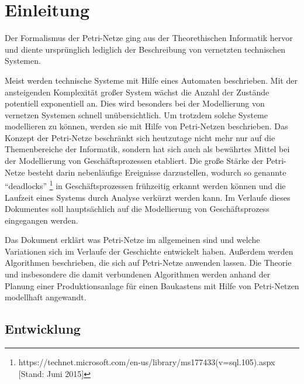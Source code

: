 \section{Einleitung}
Der Formalismus der Petri-Netze ging aus der Theorethischen Informatik hervor
und diente ursprünglich lediglich der Beschreibung von vernetzten technischen Systemen.

Meist werden technische Systeme mit Hilfe eines Automaten beschrieben.
Mit der ansteigenden Komplexität großer System wächst die Anzahl der Zustände potentiell exponentiell an.
Dies wird besonders bei der Modellierung von vernetzen Systemen schnell unübersichtlich.
Um trotzdem solche Systeme modellieren zu können, werden sie mit Hilfe von Petri-Netzen beschrieben.
Das Konzept der Petri-Netze beschränkt sich heutzutage nicht mehr nur auf die Themenbereiche der Informatik,
sondern hat sich auch als bewährtes Mittel bei der Modellierung von Geschäftsprozessen etabliert.
Die große Stärke der Petri-Netze besteht darin nebenläufige Ereignisse darzustellen,
wodurch so genannte \enquote{deadlocks} \footnote{https://technet.microsoft.com/en-us/library/ms177433(v=sql.105).aspx [Stand: Juni 2015]}
in Geschäftsprozessen frühzeitig erkannt werden können und 
die Laufzeit eines Systems durch Analyse verkürzt werden kann.
Im Verlaufe dieses Dokumentes soll hauptsächlich auf die Modellierung von Geschäftsprozess eingegangen werden. 

Das Dokument erklärt was Petri-Netze im allgemeinen sind und
welche Variationen sich im Verlaufe der Geschichte entwickelt haben.
Außerdem werden Algorithmen beschrieben, die sich auf Petri-Netze anwenden lassen.
Die Theorie und insbesondere die damit verbundenen Algorithmen
werden anhand der Planung einer Produktionsanlage für einen Baukastens
mit Hilfe von Petri-Netzen modellhaft angewandt.


\subsection{Entwicklung}
